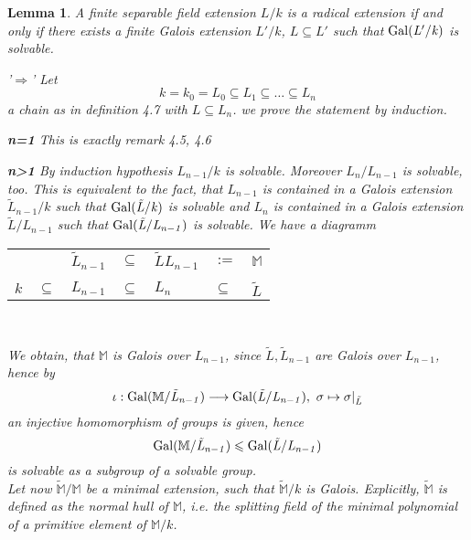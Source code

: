 \documentclass[11pt]{book}
\newtheorem{lemma}[theorem]{Lemma}
\theoremstyle{nonumberbreak}
\newenvironment{pr}[1][]{\ifthenelse{\equal{#1}{}}{\proof}{\proof[#1]}\rm}{\endproof}
\newcommand\tabrotate[1]{\rotatebox{90}{#1\hspace{\tabcolsep}}}
\begin{document}
\begin{spacing}{1.3}
\begin{lemma}%
A finite separable field extension $L/k$ is a radical extension if and only if there exists a finite Galois extension $L'/k$, $L \subseteq L'$ such that $\rm{Gal}\it(L'/k)$ is solvable.
\begin{pr}
\begin{compactitem}
\item['$\Rightarrow$'] Let $$k=k_0=L_0 \subseteq L_1 \subseteq \dots \subseteq L_n$$ a chain as in definition 4.7 with $L \subseteq L_n$. we prove the statement by induction.
\begin{compactitem}
\item[\bf{n=1}] This is exactly remark 4.5, 4.6
\item[\bf{n>1}] By induction hypothesis $L_{n-1}/k$ is solvable. Moreover $L_n/L_{n-1}$ is solvable, too. This is equivalent to the fact, that
$L_{n-1}$ is contained in a Galois extension $\tilde{L}_{n-1}/k$ such that $\rm{Gal}\it(\tilde{L}/k)$ is solvable and
$L_n$ is contained in a Galois extension $\tilde{L}/L_{n-1}$ such that $\rm{Gal}\it(\tilde{L}/L_{n-1})$ is solvable.
We have a diagramm
\begin{center}
\begin{tabular}{*{7}{l}}
&& $\tilde{L}_{n-1}$ & $\subseteq$ &$ \tilde{L}L_{n-1}$ &$ := $& $\mathbb{M} $\\
&& \tabrotate{$\subseteq$} &&&& \tabrotate{$\subseteq$}\\
$k$ & $\subseteq$ &$ L_{n-1} $&$ \subseteq$ &$ L_n $&$ \subseteq $& $\tilde{L} $\\
\end{tabular}\\
\end{center}
We obtain, that $\mathbb{M}$ is Galois over $L_{n-1}$, since $\tilde{L}, \tilde{L}_{n-1}$ are Galois over $L_{n-1}$, hence by
$$\iota: \rm{Gal}\it(\mathbb{M}/\tilde{L}_{n-1}) \longrightarrow \rm{Gal}\it(\tilde{L}/L_{n-1}), \textrm{ } \sigma \mapsto \sigma |_{\tilde{L}}$$ an injective homomorphism of groups is given, hence $$\rm{Gal}\it(\mathbb{M}/\tilde{L}_{n-1}) \leqslant \rm{Gal}\it(\tilde{L}/L_{n-1})$$ is solvable as a subgroup of a solvable group.\\
Let now $\tilde{\mathbb{M}}/\mathbb{M}$ be a minimal extension, such that $\tilde{\mathbb{M}}/k$ is Galois. Explicitly, $\tilde{\mathbb{M}}$ is defined as the \textit{normal hull} of $\mathbb{M}$, i.e. the splitting field of the minimal polynomial of a primitive element of $\mathbb{M}/k$.\\

\end{compactitem}
\end{compactitem}
\end{pr}
\end{lemma}
\end{spacing}
\end{document}
